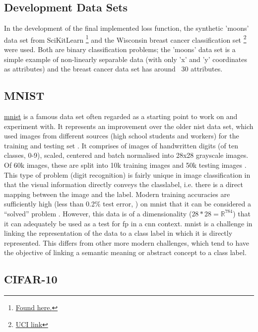 \subsection{Development Data Sets}

In the development of the final implemented loss function, the synthetic 'moons' data set from SciKitLearn \footnote{\href{https://scikit-learn.org/stable/modules/generated/sklearn.datasets.make_moons.html}{Found here.}} and the Wisconsin breast cancer classification set \cite{uci_ml_data} \footnote{\href{https://archive.ics.uci.edu/ml/datasets/Breast+Cancer+Wisconsin+(Diagnostic)}{UCI link}} were used. Both are binary classification problems; the 'moons' data set is a simple example of non-linearly separable data (with only 'x' and 'y' coordinates as attributes) and the breast cancer data set has around ~30 attributes.

\subsection{MNIST}
 
\href{http://yann.lecun.com/exdb/mnist/}{\gls{mnist}} is a famous data set often regarded as a starting point to work on and experiment with. It represents an improvement over the older \gls{nist} data set, which used images from different sources (high school students and workers) for the training and testing set \cite{nist}. It comprises of images of handwritten digits (of ten classes, 0-9), scaled, centered and batch normalised into 28x28 grayscale images. Of 60k images, these are split into 10k training images and 50k testing images \cite{mnist}. This type of problem (digit recognition) is fairly unique in image classification in that the visual information directly conveys the \gls{classlabel}, i.e. there is a direct mapping between the image and the label. Modern training accuracies are sufficiently high (less than 0.2\% test error, \cite{mnist_sota}) on \gls{mnist} that it can be considered a \enquote{solved} problem \cite{mnist_sota_web}. However, this data is of a dimensionality ($28 * 28 = \mathds{R}^{784}$) that it can adequately be used as a test for \gls{fp} in a \gls{cnn} context. \Gls{mnist} is a challenge in linking the representation of the data to a class label in which it is directly represented. This differs from other more modern challenges, which tend to have the objective of linking a semantic meaning or abstract concept to a class label. 
\bigskip


\subsection{CIFAR-10}

